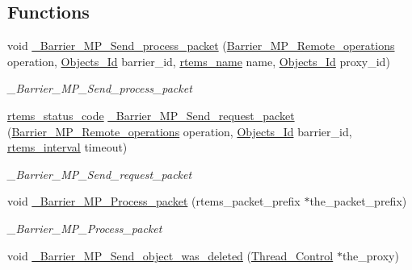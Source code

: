 \subsection*{Functions}
\begin{DoxyCompactItemize}
\item 
void \mbox{\hyperlink{group__ClassicBarrierMP_ga1bf88d4bcfbe673860d2c0c3f565271e}{\+\_\+\+Barrier\+\_\+\+M\+P\+\_\+\+Send\+\_\+process\+\_\+packet}} (\mbox{\hyperlink{group__ClassicBarrierMP_ga14a42806fd76d110a17d806124a892d0}{Barrier\+\_\+\+M\+P\+\_\+\+Remote\+\_\+operations}} operation, \mbox{\hyperlink{group__RTEMSScoreObject_ga5821f52a51072941bdd603e542d0863e}{Objects\+\_\+\+Id}} barrier\+\_\+id, \mbox{\hyperlink{group__ClassicTasks_ga55fb63c49f68c0cbd9bee004da15b1fd}{rtems\+\_\+name}} name, \mbox{\hyperlink{group__RTEMSScoreObject_ga5821f52a51072941bdd603e542d0863e}{Objects\+\_\+\+Id}} proxy\+\_\+id)
\begin{DoxyCompactList}\small\item\em \+\_\+\+Barrier\+\_\+\+M\+P\+\_\+\+Send\+\_\+process\+\_\+packet \end{DoxyCompactList}\item 
\mbox{\hyperlink{group__ClassicStatus_ga545d41846817eaba6143d52ee4d9e9fe}{rtems\+\_\+status\+\_\+code}} \mbox{\hyperlink{group__ClassicBarrierMP_ga7aa5d74ce738310ef9ff89448117235a}{\+\_\+\+Barrier\+\_\+\+M\+P\+\_\+\+Send\+\_\+request\+\_\+packet}} (\mbox{\hyperlink{group__ClassicBarrierMP_ga14a42806fd76d110a17d806124a892d0}{Barrier\+\_\+\+M\+P\+\_\+\+Remote\+\_\+operations}} operation, \mbox{\hyperlink{group__RTEMSScoreObject_ga5821f52a51072941bdd603e542d0863e}{Objects\+\_\+\+Id}} barrier\+\_\+id, \mbox{\hyperlink{group__ClassicTasks_gad39c43f949683d46874e3a5586b93aee}{rtems\+\_\+interval}} timeout)
\begin{DoxyCompactList}\small\item\em \+\_\+\+Barrier\+\_\+\+M\+P\+\_\+\+Send\+\_\+request\+\_\+packet \end{DoxyCompactList}\item 
void \mbox{\hyperlink{group__ClassicBarrierMP_ga835461ad93f2a18c9ea8c4db10071290}{\+\_\+\+Barrier\+\_\+\+M\+P\+\_\+\+Process\+\_\+packet}} (rtems\+\_\+packet\+\_\+prefix $\ast$the\+\_\+packet\+\_\+prefix)
\begin{DoxyCompactList}\small\item\em \+\_\+\+Barrier\+\_\+\+M\+P\+\_\+\+Process\+\_\+packet \end{DoxyCompactList}\item 
void \mbox{\hyperlink{group__ClassicBarrierMP_gae19b67a9cc104a4800d8d1d87f7b33a6}{\+\_\+\+Barrier\+\_\+\+M\+P\+\_\+\+Send\+\_\+object\+\_\+was\+\_\+deleted}} (\mbox{\hyperlink{struct__Thread__Control}{Thread\+\_\+\+Control}} $\ast$the\+\_\+proxy)

\end{DoxyCompactItemize}
